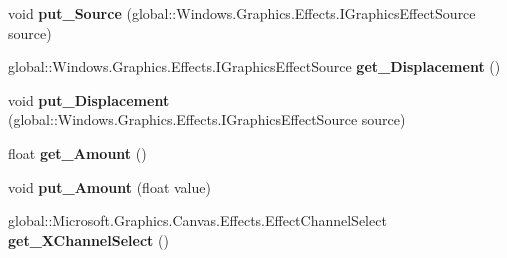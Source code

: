 \begin{DoxyCompactItemize}
\item 
\mbox{\label{interface_microsoft_1_1_graphics_1_1_canvas_1_1_effects_1_1_i_displacement_map_effect_a7510937c3744875c4cbbb6cb41254bd2}} 
void {\bfseries put\+\_\+\+Source} (global\+::\+Windows.\+Graphics.\+Effects.\+I\+Graphics\+Effect\+Source source)
\item 
\mbox{\label{interface_microsoft_1_1_graphics_1_1_canvas_1_1_effects_1_1_i_displacement_map_effect_ac59cc7dd5374f30d71b753983dba806d}} 
global\+::\+Windows.\+Graphics.\+Effects.\+I\+Graphics\+Effect\+Source {\bfseries get\+\_\+\+Displacement} ()
\item 
\mbox{\label{interface_microsoft_1_1_graphics_1_1_canvas_1_1_effects_1_1_i_displacement_map_effect_a2d5970972f40598f146c9ef349c15471}} 
void {\bfseries put\+\_\+\+Displacement} (global\+::\+Windows.\+Graphics.\+Effects.\+I\+Graphics\+Effect\+Source source)
\item 
\mbox{\label{interface_microsoft_1_1_graphics_1_1_canvas_1_1_effects_1_1_i_displacement_map_effect_a7aebbe3771b9e29fcf061b4a886e6364}} 
float {\bfseries get\+\_\+\+Amount} ()
\item 
\mbox{\label{interface_microsoft_1_1_graphics_1_1_canvas_1_1_effects_1_1_i_displacement_map_effect_a047ea38a52db6d5b2bc8f9a69edc8c1f}} 
void {\bfseries put\+\_\+\+Amount} (float value)
\item 
\mbox{\label{interface_microsoft_1_1_graphics_1_1_canvas_1_1_effects_1_1_i_displacement_map_effect_aae337ddbef97551a32257022a3fa66a9}} 
global\+::\+Microsoft.\+Graphics.\+Canvas.\+Effects.\+Effect\+Channel\+Select {\bfseries get\+\_\+\+X\+Channel\+Select} ()
\item 
\mbox{\label{interface_microsoft_1_1_graphics_1_1_canvas_1_1_effects_1_1_i_displacement_map_effect_abe51385c67bec880ea3db9f871d8a0b1}} 

\end{DoxyCompactItemize}
